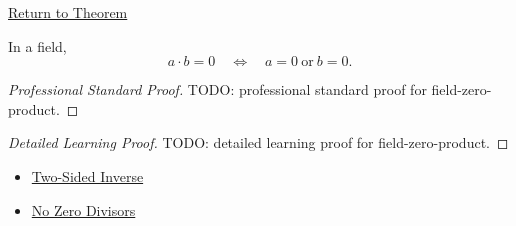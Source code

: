 \newpage
{}
\label{prf:field-zero-product}

\begin{remark*}[Return]
\hyperref[def:zero-divisor]{Return to Theorem}
\end{remark*}

\begin{theorem*}
In a field,
\[
a\cdot b=0
\quad\Longleftrightarrow\quad
a=0\ \text{or}\ b=0.
\]
\end{theorem*}

\begin{proof}[Professional Standard Proof]
\LRAProofBodyStart
TODO: professional standard proof for field-zero-product.
\end{proof}

\begin{proof}[Detailed Learning Proof]
\LRAProofBodyStart
TODO: detailed learning proof for field-zero-product.
\end{proof}

\begin{remark*}
\end{remark*}

\begin{dependencies}
\begin{itemize}
  \item \hyperref[def:two-sided-inverse]{Two-Sided Inverse}
  \item \hyperref[thm:no-zero-divisors]{No Zero Divisors}
\end{itemize}
\end{dependencies}

\clearpage
